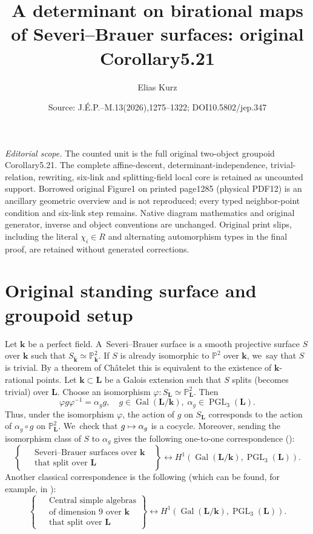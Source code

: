 \documentclass[10pt,a4paper]{amsart}
\title[Severi--Brauer groupoid determinant]{A determinant on birational maps of Severi--Brauer surfaces: original Corollary5.21}
\author{Elias Kurz}
\date{Source: J.\'E.P.--M.13(2026),1275--1322; DOI10.5802/jep.347}
\newcommand\mto{\mathchoice{\longmapsto}{\mapsto}{\mapsto}{\mapsto}}
\DeclareMathOperator{\Gal}{Gal}
\theoremstyle{definition}
\newcommand{\kk}{{\boldsymbol{k}}}
\newcommand{\LL}{{\boldsymbol{L}}}
\DeclareMathOperator{\PGL}{PGL}
\begin{document}
\maketitle
\noindent\textit{Editorial scope.} The counted unit is the full original two-object groupoid Corollary5.21. The complete affine-descent, determinant-independence, trivial-relation, rewriting, six-link and splitting-field local core is retained as uncounted support. Borrowed original Figure1 on printed page1285 (physical PDF12) is an ancillary geometric overview and is not reproduced; every typed neighbor-point condition and six-link step remains. Native diagram mathematics and original generator, inverse and object conventions are unchanged. Original print slips, including the literal $\chi_i\in R$ and alternating automorphism types in the final proof, are retained without generated corrections.
\section{Original standing surface and groupoid setup}
Let $\kk$ be a perfect field. A~Severi--Brauer surface is a smooth projective surface $S$ over $\kk$ such that $S_{\bar{\kk}} \simeq \mathbb{P}^2_{\bar{\kk}}$. If $S$ is already isomorphic to $\mathbb{P}^2$ over $\kk$, we~say that $S$ is trivial. By a theorem of Châtelet this is equivalent to the existence of $\kk$-rational points. Let $\kk \subset \LL$ be a Galois extension such that $S$ splits (becomes trivial) over $\LL$. Choose an isomorphism $\varphi\colon S_{\LL} \simeq \mathbb{P}^2_{\LL}$. Then
\[
\varphi g \varphi^{-1} = \alpha_g g,\quad g \in \Gal(\LL/\kk), \;\alpha_g \in \PGL_3(\LL).
\]
Thus, under the isomorphism $\varphi$, the action of $g$ on $S_{\LL}$ corresponds to the action of $\alpha_g \circ g$ on $\mathbb{P}^2_{\LL}$. We~check that $g \mto \alpha_g$ is a cocycle. Moreover, sending the isomorphism class of $S$ to $\alpha_g$ gives the following one-to-one correspondence (\cite[I\S 5, III\S 1]{serre1997galois}):
\[
\left \{ \begin{aligned} & \text{ Severi--Brauer surfaces over~$\kk$ } \\[
-3pt] & \text{ that split over $\LL$ } \end{aligned} \right \} \longleftrightarrow H^1(\Gal(\LL/ \kk), \PGL_3(\LL)).
\]
Another classical correspondence is the following (which can be found, for example, in \cite[X\S 5]{serre2004corps}):
\[
\left \{ \begin{aligned} & \text{ Central simple algebras} \\[
-3pt] & \text{ of dimension 9 over~$\kk$ }\\[
-3pt]& \text{ that split over $\LL$ } \end{aligned} \right \} \longleftrightarrow H^1(\Gal(\LL/ \kk), \PGL_3(\LL)).
\]
\end{document}
